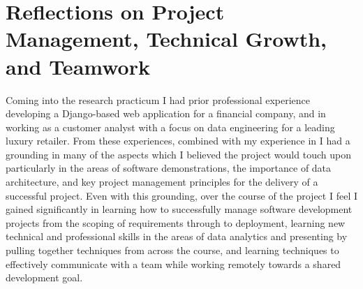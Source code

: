 \documentclass{scrreprt}
\begin{document}
\chapter{Reflections on Project Management, Technical Growth, and Teamwork}\label{Intro}
Coming into the research practicum I had prior professional experience developing a Django-based web application for a financial company, and in working as a customer analyst with a focus on data engineering for a leading luxury retailer. From these experiences, combined with my experience in  I had a grounding in many of the aspects which I believed the project would touch upon particularly in the areas of software demonstrations, the importance of data architecture, and key project management principles for the delivery of a successful project. Even with this grounding, over the course of the project I feel I gained significantly in learning how to successfully manage software development projects from the scoping of requirements through to deployment, learning new technical and professional skills in the areas of data analytics and presenting by pulling together techniques from across the course, and learning techniques to effectively communicate with a team while working remotely towards a shared development goal.
\newline
\newline
\end{document}
